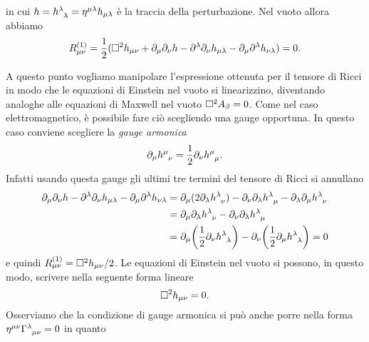 in cui $h = \tensor{h}{^{\lambda}_{\lambda}} = \eta^{\mu\lambda} h_{\mu\lambda}$
è la traccia della perturbazione.  Nel vuoto allora abbiamo
\begin{equation}
  R_{\mu\nu}^{(1)} = \frac{1}{2} (\Box^{2} h_{\mu\nu}
  + \partial_{\mu}\partial_{\nu} h - \partial^{\lambda}\partial_{\nu}
  h_{\mu\lambda} - \partial_{\mu}\partial^{\lambda} h_{\nu\lambda}) = 0.
\end{equation}

A questo punto vogliamo manipolare l'espressione ottenuta per il tensore di
Ricci in modo che le equazioni di Einstein nel vuoto si linearizzino, diventando
analoghe alle equazioni di Maxwell nel vuoto $\Box^{2} A_{\beta} = 0$.  Come nel
caso elettromagnetico, è possibile fare ciò scegliendo una gauge opportuna.  In
questo caso conviene scegliere la \emph{gauge armonica}
\begin{equation}
  \label{eq:gauge-armonica}
  \partial_{\mu} \tensor{h}{^{\mu}_{\nu}} =
  \frac{1}{2}\partial_{\nu}\tensor{h}{^{\mu}_{\mu}}.
\end{equation}
Infatti usando questa gauge gli ultimi tre termini del tensore di Ricci si
annullano
\begin{equation}
  \begin{split}
    \partial_{\mu}\partial_{\nu} h - \partial^{\lambda}\partial_{\nu}
    h_{\mu\lambda} - \partial_{\mu}\partial^{\lambda} h_{\nu\lambda}
    &= \partial_{\mu}(2 \partial_{\lambda}\tensor{h}{^{\lambda}_{\nu}})
    - \partial_{\nu}\partial_{\lambda}\tensor{h}{^{\lambda}_{\mu}}
    - \partial_{\lambda}\partial_{\mu} \tensor{h}{^{\lambda}_{\nu}} \\
    &= \partial_{\mu}\partial_{\lambda} \tensor{h}{^{\lambda}_{\nu}}
    - \partial_{\nu}\partial_{\lambda} \tensor{h}{^{\lambda}_{\mu}} \\
    &= \partial_{\mu}\bigg(\frac{1}{2}\partial_{\nu}
    \tensor{h}{^{\lambda}_{\lambda}}\bigg)
    - \partial_{\nu}\bigg(\frac{1}{2}\partial_{\mu}
    \tensor{h}{^{\lambda}_{\lambda}}\bigg) = 0
  \end{split}
\end{equation}
e quindi $R_{\mu\nu}^{(1)} = \Box^{2} h_{\mu\nu}/2$.  Le equazioni di Einstein
nel vuoto si possono, in questo modo, scrivere nella seguente forma lineare
\begin{equation}
  \label{eq:einstein-lineare}
  \Box^{2} h_{\mu\nu} = 0.
\end{equation}
Osserviamo che la condizione di gauge armonica si può anche porre nella forma
$\eta^{\mu\nu}\tensor{\Gamma}{^{\lambda}_{\mu\nu}} = 0$ in quanto
